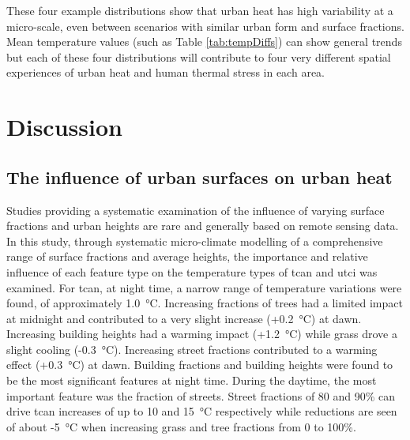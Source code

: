 \documentclass[final,3p,times,authoryear]{elsarticle}
\begin{document}
These four example distributions show that urban heat has high variability at a micro-scale, even between scenarios with similar urban form and surface fractions. Mean temperature values (such as Table \ref{tab:tempDiffs}) can show general trends but each of these four distributions will contribute to four very different spatial experiences of urban heat and human thermal stress in each area.


\section{Discussion}\label{sec:discussion}

\subsection{The influence of urban surfaces on urban heat}\label{sec:discinfluence}

Studies providing a systematic examination of the influence of varying surface fractions and urban heights are rare and generally based on remote sensing data. In this study, through systematic micro-climate modelling of a comprehensive range of surface fractions and average heights, the importance and relative influence of each feature type on the temperature types of \gls{tcan} and \gls{utci} was examined. For \gls{tcan}, at night time, a narrow range of temperature variations were found, of approximately 1.0\SI{}{\degreeCelsius}. Increasing fractions of trees had a limited impact at midnight and contributed to a very slight increase (+0.2\SI{}{\degreeCelsius}) at dawn. Increasing building heights had a warming impact (+1.2\SI{}{\degreeCelsius}) while grass drove a slight cooling (-0.3\SI{}{\degreeCelsius}). Increasing street fractions contributed to a warming effect (+0.3\SI{}{\degreeCelsius}) at dawn. Building fractions and building heights were found to be the most significant features at night time. During the daytime, the most important feature was the fraction of streets. Street fractions of 80 and 90\% can drive \gls{tcan} increases of up to 10 and 15\SI{}{\degreeCelsius} respectively while reductions are seen of about -5\SI{}{\degreeCelsius} when increasing grass and tree fractions from 0 to 100\%. 
\end{document}
